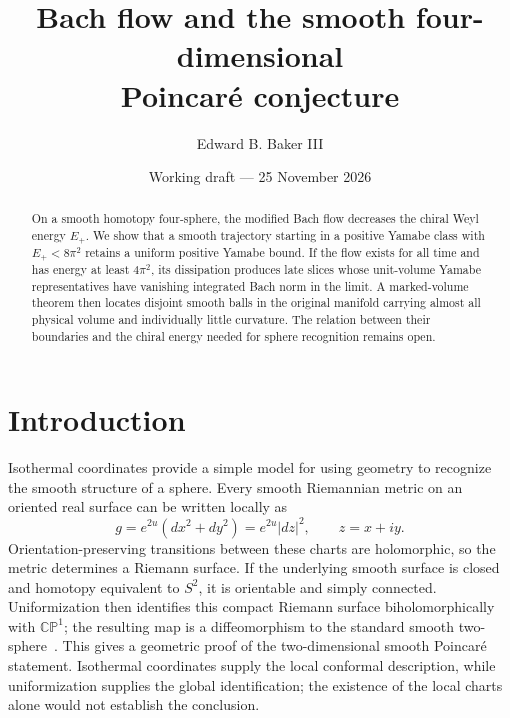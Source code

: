 \documentclass[11pt]{article}
\title{Bach flow and the smooth four-dimensional\\Poincar\'e conjecture}
\author{Edward B. Baker III}
\date{Working draft --- 25 November 2026}
\numberwithin{equation}{section}
\newcommand{\CP}{\mathbb{CP}}
\begin{document}
\maketitle
\thispagestyle{plain}

\begin{abstract}
On a smooth homotopy four-sphere, the modified Bach flow decreases
the chiral Weyl energy \(E_+\). We show that a smooth trajectory
starting in a positive Yamabe class with \(E_+<8\pi^2\) retains a
uniform positive Yamabe bound. If the flow exists for all time and
has energy at least \(4\pi^2\), its dissipation produces late slices
whose unit-volume Yamabe representatives have vanishing integrated
Bach norm in the limit. A marked-volume theorem then locates disjoint
smooth balls in the original manifold carrying almost all physical
volume and individually little curvature. The relation between their
boundaries and the chiral energy needed for sphere recognition remains
open.
\end{abstract}

\section{Introduction}\label{sec:introduction}

Isothermal coordinates provide a simple model for using geometry to
recognize the smooth structure of a sphere. Every smooth Riemannian metric
on an oriented real surface can be written locally as
\[
 g=e^{2u}(dx^2+dy^2)=e^{2u}|dz|^2,\qquad z=x+iy.
\]
Orientation-preserving transitions between these charts are holomorphic,
so the metric determines a Riemann surface. If the underlying smooth
surface is closed and homotopy equivalent to \(S^2\), it is orientable
and simply connected. Uniformization then identifies this compact Riemann
surface biholomorphically with \(\CP^1\); the resulting map is a
diffeomorphism to the standard smooth two-sphere~\cite{Donaldson2011}.
This gives a geometric proof of the two-dimensional smooth Poincar\'e
statement. Isothermal coordinates supply the local conformal description,
while uniformization supplies the global identification; the existence of
the local charts alone would not establish the conclusion.
\end{document}
